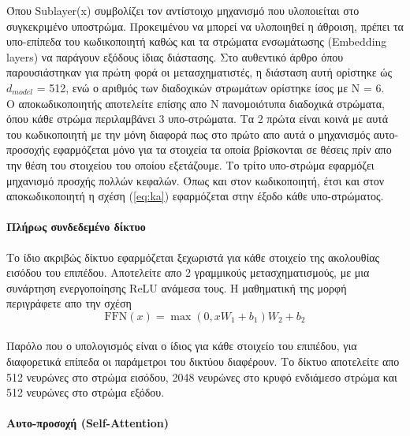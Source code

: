 \documentclass[12pt]{article}
\numberwithin{equation}{section}
\begin{document}
Όπου Sublayer(x) συμβολίζει τον αντίστοιχο μηχανισμό που υλοποιείται στο συγκεκριμένο υποστρώμα. Προκειμένου να μπορεί να υλοποιηθεί η άθροιση, πρέπει τα υπο-επίπεδα του κωδικοποιητή καθώς και τα στρώματα ενσωμάτωσης (Embedding layers) να παράγουν εξόδους ίδιας διάστασης. Στο αυθεντικό άρθρο όπου παρουσιάστηκαν για πρώτη φορά οι μετασχηματιστές, η διάσταση αυτή ορίστηκε ώς \(d_{model}\) = 512, ενώ ο αριθμός των διαδοχικών στρωμάτων ορίστηκε ίσος με N = 6.\\

Ο αποκωδικοποιητής αποτελείτε επίσης απο Ν πανομοιότυπα διαδοχικά στρώματα, όπου κάθε στρώμα περιλαμβάνει 3 υπο-στρώματα. Τα 2 πρώτα είναι κοινά με αυτά του κωδικοποιητή με την μόνη διαφορά πως στο πρώτο απο αυτά ο μηχανισμός αυτο-προσοχής εφαρμόζεται μόνο για τα στοιχεία τα οποία βρίσκονται σε θέσεις πρίν απο την θέση του στοιχείου του οποίου εξετάζουμε. Το τρίτο υπο-στρώμα εφαρμόζει μηχανισμό προσχής πολλών κεφαλών. Όπως και στον κωδικοποιητή, έτσι και στον αποκωδικοποιητή η σχέση (\ref{eq:ka}) εφαρμόζεται στην έξοδο κάθε υπο-στρώματος.  \\

\paragraph{Πλήρως συνδεδεμένο δίκτυο\\[0.5 cm]}

Το ίδιο ακριβώς δίκτυο εφαρμόζεται ξεχωριστά για κάθε στοιχείο της ακολουθίας εισόδου του επιπέδου. Αποτελείτε απο 2 γραμμικούς μετασχηματισμούς, με μια συνάρτηση ενεργοποίησης ReLU ανάμεσα τους. Η μαθηματική της μορφή περιγράφετε απο την σχέση \\

\begin{equation}
\text{FFN}(x) = \max(0, xW_1 + b_1)W_2 + b_2
\end{equation}\\

Παρόλο που ο υπολογισμός είναι ο ίδιος για κάθε στοιχείο του επιπέδου, για διαφορετικά επίπεδα οι παράμετροι του δικτύου διαφέρουν. Το δίκτυο αποτελείτε απο 512 νευρώνες στο στρώμα εισόδου, 2048 νευρώνες στο κρυφό ενδιάμεσο στρώμα και 512 νευρώνες στο στρώμα εξόδου. \\

\paragraph{Αυτο-προσοχή (Self-Attention) \\ [0.5 cm]}
\end{document}
